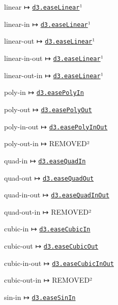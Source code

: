 \begin{DoxyItemize}
\item linear ↦ \href{https://github.com/d3/d3-ease/blob/master/README.md#easeLinear}{\tt d3.\+ease\+Linear}¹
\item linear-\/in ↦ \href{https://github.com/d3/d3-ease/blob/master/README.md#easeLinear}{\tt d3.\+ease\+Linear}¹
\item linear-\/out ↦ \href{https://github.com/d3/d3-ease/blob/master/README.md#easeLinear}{\tt d3.\+ease\+Linear}¹
\item linear-\/in-\/out ↦ \href{https://github.com/d3/d3-ease/blob/master/README.md#easeLinear}{\tt d3.\+ease\+Linear}¹
\item linear-\/out-\/in ↦ \href{https://github.com/d3/d3-ease/blob/master/README.md#easeLinear}{\tt d3.\+ease\+Linear}¹
\item poly-\/in ↦ \href{https://github.com/d3/d3-ease/blob/master/README.md#easePolyIn}{\tt d3.\+ease\+Poly\+In}
\item poly-\/out ↦ \href{https://github.com/d3/d3-ease/blob/master/README.md#easePolyOut}{\tt d3.\+ease\+Poly\+Out}
\item poly-\/in-\/out ↦ \href{https://github.com/d3/d3-ease/blob/master/README.md#easePolyInOut}{\tt d3.\+ease\+Poly\+In\+Out}
\item poly-\/out-\/in ↦ R\+E\+M\+O\+V\+E\+D²
\item quad-\/in ↦ \href{https://github.com/d3/d3-ease/blob/master/README.md#easeQuadIn}{\tt d3.\+ease\+Quad\+In}
\item quad-\/out ↦ \href{https://github.com/d3/d3-ease/blob/master/README.md#easeQuadOut}{\tt d3.\+ease\+Quad\+Out}
\item quad-\/in-\/out ↦ \href{https://github.com/d3/d3-ease/blob/master/README.md#easeQuadInOut}{\tt d3.\+ease\+Quad\+In\+Out}
\item quad-\/out-\/in ↦ R\+E\+M\+O\+V\+E\+D²
\item cubic-\/in ↦ \href{https://github.com/d3/d3-ease/blob/master/README.md#easeCubicIn}{\tt d3.\+ease\+Cubic\+In}
\item cubic-\/out ↦ \href{https://github.com/d3/d3-ease/blob/master/README.md#easeCubicOut}{\tt d3.\+ease\+Cubic\+Out}
\item cubic-\/in-\/out ↦ \href{https://github.com/d3/d3-ease/blob/master/README.md#easeCubicInOut}{\tt d3.\+ease\+Cubic\+In\+Out}
\item cubic-\/out-\/in ↦ R\+E\+M\+O\+V\+E\+D²
\item sin-\/in ↦ \href{https://github.com/d3/d3-ease/blob/master/README.md#easeSinIn}{\tt d3.\+ease\+Sin\+In}

\end{DoxyItemize}
